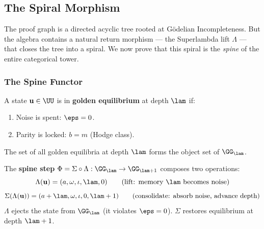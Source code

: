 \subsection{The Spiral Morphism}

The proof graph is a directed acyclic tree rooted at G\"odelian Incompleteness. But the algebra contains a natural return morphism --- the Superlambda lift $\Lambda$ --- that closes the tree into a spiral. We now prove that this spiral is the \emph{spine} of the entire categorical tower.

\subsubsection*{The Spine Functor}

\begin{definition}\label{def:golden-eq}
A state $\mathbf{u} \in \UU$ is in \textbf{golden equilibrium} at depth $\lam$ if:
\begin{enumerate}
\item Noise is spent: $\eps = 0$.
\item Parity is locked: $b = m$ (Hodge class).
\end{enumerate}
The set of all golden equilibria at depth $\lam$ forms the object set of $\GG_\lam$.
\end{definition}

\begin{definition}\label{def:spine}
The \textbf{spine step} $\Phi = \Sigma \circ \Lambda : \GG_\lam \to \GG_{\lam+1}$ composes two operations:
$$\Lambda(\mathbf{u}) = (a, \omega, \iota, \lam, 0) \qquad \text{(lift: memory $\lam$ becomes noise)}$$
$$\Sigma(\Lambda(\mathbf{u})) = (a + \lam, \omega, \iota, 0, \lam + 1) \qquad \text{(consolidate: absorb noise, advance depth)}$$
$\Lambda$ ejects the state from $\GG_\lam$ (it violates $\eps = 0$). $\Sigma$ restores equilibrium at depth $\lam + 1$.
\end{definition}

